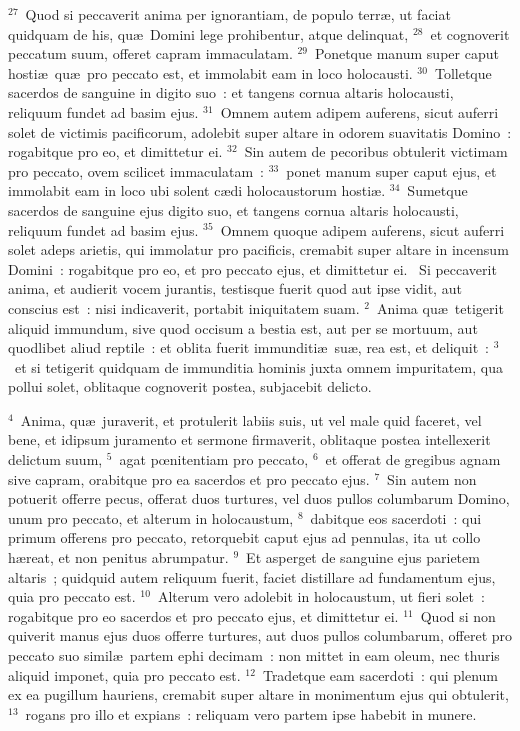 ${}^{27}$~Quod si peccaverit anima per ignorantiam, de populo terr\ae , ut faciat quidquam de his, qu\ae\ Domini lege prohibentur, atque delinquat,
${}^{28}$~et cognoverit peccatum suum, offeret capram immaculatam.
${}^{29}$~Ponetque manum super caput hosti\ae\ qu\ae\ pro peccato est, et immolabit eam in loco holocausti.
${}^{30}$~Tolletque sacerdos de sanguine in digito suo~: et tangens cornua altaris holocausti, reliquum fundet ad basim ejus.
${}^{31}$~Omnem autem adipem auferens, sicut auferri solet de victimis pacificorum, adolebit super altare in odorem suavitatis Domino~: rogabitque pro eo, et dimittetur ei.
${}^{32}$~Sin autem de pecoribus obtulerit victimam pro peccato, ovem scilicet immaculatam~:
${}^{33}$~ponet manum super caput ejus, et immolabit eam in loco ubi solent c\ae di holocaustorum hosti\ae .
${}^{34}$~Sumetque sacerdos de sanguine ejus digito suo, et tangens cornua altaris holocausti, reliquum fundet ad basim ejus.
${}^{35}$~Omnem quoque adipem auferens, sicut auferri solet adeps arietis, qui immolatur pro pacificis, cremabit super altare in incensum Domini~: rogabitque pro eo, et pro peccato ejus, et dimittetur ei.
~Si peccaverit anima, et audierit vocem jurantis, testisque fuerit quod aut ipse vidit, aut conscius est~: nisi indicaverit, portabit iniquitatem suam.
${}^{2}$~Anima qu\ae\ tetigerit aliquid immundum, sive quod occisum a bestia est, aut per se mortuum, aut quodlibet aliud reptile~: et oblita fuerit immunditi\ae\ su\ae , rea est, et deliquit~:
${}^{3}$~et si tetigerit quidquam de immunditia hominis juxta omnem impuritatem, qua pollui solet, oblitaque cognoverit postea, subjacebit delicto.


${}^{4}$~Anima, qu\ae\ juraverit, et protulerit labiis suis, ut vel male quid faceret, vel bene, et idipsum juramento et sermone firmaverit, oblitaque postea intellexerit delictum suum,
${}^{5}$~agat pœnitentiam pro peccato,
${}^{6}$~et offerat de gregibus agnam sive capram, orabitque pro ea sacerdos et pro peccato ejus.
${}^{7}$~Sin autem non potuerit offerre pecus, offerat duos turtures, vel duos pullos columbarum Domino, unum pro peccato, et alterum in holocaustum,
${}^{8}$~dabitque eos sacerdoti~: qui primum offerens pro peccato, retorquebit caput ejus ad pennulas, ita ut collo h\ae reat, et non penitus abrumpatur.
${}^{9}$~Et asperget de sanguine ejus parietem altaris~; quidquid autem reliquum fuerit, faciet distillare ad fundamentum ejus, quia pro peccato est.
${}^{10}$~Alterum vero adolebit in holocaustum, ut fieri solet~: rogabitque pro eo sacerdos et pro peccato ejus, et dimittetur ei.
${}^{11}$~Quod si non quiverit manus ejus duos offerre turtures, aut duos pullos columbarum, offeret pro peccato suo simil\ae\ partem ephi decimam~: non mittet in eam oleum, nec thuris aliquid imponet, quia pro peccato est.
${}^{12}$~Tradetque eam sacerdoti~: qui plenum ex ea pugillum hauriens, cremabit super altare in monimentum ejus qui obtulerit,
${}^{13}$~rogans pro illo et expians~: reliquam vero partem ipse habebit in munere.


